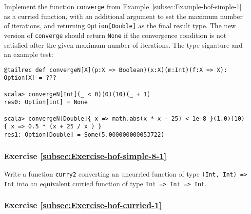 Implement the function \lstinline!converge!
from Example~\ref{subsec:Example-hof-simple-1} as a curried function,
with an additional argument to set the maximum number of iterations,
and returning \lstinline!Option[Double]!
as the final result type. The new version of \lstinline!converge!
should return \lstinline!None!
if the convergence condition is not satisfied after the given maximum
number of iterations. The type signature and an example test:
\begin{lstlisting}
@tailrec def convergeN[X](p:X => Boolean)(x:X)(m:Int)(f:X => X): Option[X] = ???

scala> convergeN[Int](_ < 0)(0)(10)(_ + 1)
res0: Option[Int] = None

scala> convergeN[Double]{ x => math.abs(x * x - 25) < 1e-8 }(1.0)(10) { x => 0.5 * (x + 25 / x ) }
res1: Option[Double] = Some(5.000000000053722)
\end{lstlisting}
\begin{comment}
Solution:\inputencoding{latin9}
\begin{lstlisting}
def convergeN[X](p: X => Boolean)(x:X)(m:Int)(f: X => X): Option[X] =  {
              if (m <= 0) None
              else if (p(x)) Some(x) else converge(p)(f(x))(m-1)(f)             } // Defining as def convergeN[X]: (X => Boolean) => X => Int => (X => X) => Option[X] = ??? will break tail recursion!
\end{lstlisting}
\inputencoding{utf8}\end{comment}


\subsubsection{Exercise \label{subsec:Exercise-hof-simple-8-1}\ref{subsec:Exercise-hof-simple-8-1}}

Write a function \lstinline!curry2!
converting an uncurried function of type \texttt{}\lstinline!(Int, Int) => Int!
into an equivalent curried function of type \texttt{}\lstinline!Int => Int => Int!.

\subsubsection{Exercise \label{subsec:Exercise-hof-curried-1}\ref{subsec:Exercise-hof-curried-1}}

